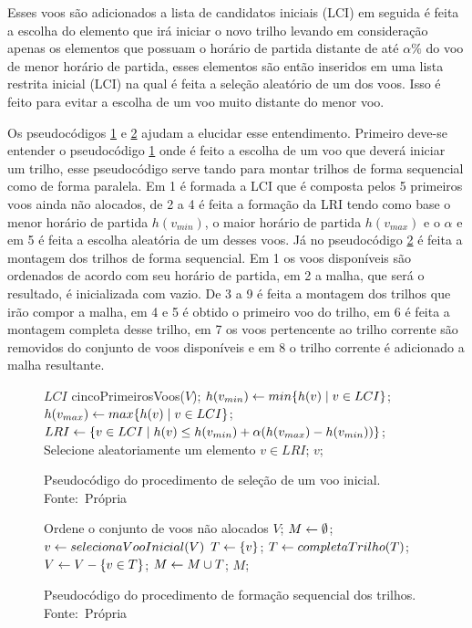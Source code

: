 Esses voos são adicionados a lista de candidatos iniciais (LCI) em seguida é
feita a escolha do elemento que irá iniciar o novo trilho levando em
consideração apenas os elementos que possuam o horário de partida distante de
até $\alpha \%$ do voo de menor horário de partida, esses elementos são então
inseridos em uma lista restrita inicial (LCI) na qual é feita a seleção
aleatório de um dos voos. Isso é feito para evitar a escolha de um voo muito
distante do menor voo.

Os pseudocódigos \ref{alg:selectinit} e \ref{alg:formseq} ajudam a elucidar esse
entendimento. Primeiro deve-se entender o pseudocódigo \ref{alg:selectinit}
onde é feito a escolha de um voo que deverá iniciar um trilho, esse
pseudocódigo serve tando para montar trilhos de forma sequencial como de forma
paralela. Em 1 é formada a LCI que é composta pelos 5 primeiros voos ainda não
alocados, de 2 a 4 é feita a formação da LRI tendo como base o menor horário de
partida $h(v_{min})$, o maior horário de partida $h(v_{max})$ e o $\alpha$ e em
5 é feita a escolha aleatória de um desses voos. Já no pseudocódigo
\ref{alg:formseq} é feita a montagem dos trilhos de forma sequencial. Em 1 os
voos disponíveis são ordenados de acordo com seu horário de partida, em 2 a
malha, que será o resultado, é inicializada com vazio. De 3 a 9 é feita a
montagem dos trilhos que irão compor a malha, em 4 e 5 é obtido o primeiro voo
do trilho, em 6 é feita a montagem completa desse trilho, em 7 os voos
pertencente ao trilho corrente são removidos do conjunto de voos disponíveis e
em 8 o trilho corrente é adicionado a malha resultante.

 \begin{figure}[h]
\caption{Pseudocódigo do procedimento de seleção de um voo inicial. \newline
\mbox{Fonte: Própria}}\label{alg:selectinit}
\begin{programma}

\STATE $LCI$ \GETS cincoPrimeirosVoos($V$);
\STATE $h(v_{min}) \leftarrow min\{h(v) \mid v \in LCI\}$;
\STATE $h(v_{max}) \leftarrow max\{h(v) \mid v \in LCI\}$;
\STATE $LRI \leftarrow \{v \in LCI \mid h(v) \leq h(v_{min}) + \alpha(h(v_{max}) -
h(v_{min}))\}$;
\STATE Selecione aleatoriamente um elemento $v \in LRI$;
\STATE\RETURN $v$;
\ENDALGORITHM
\end{programma}
\end{figure}

\begin{figure}[h]
\caption{Pseudocódigo do procedimento de formação sequencial dos trilhos.
\newline
\mbox{Fonte: Própria}}\label{alg:formseq}
\begin{programma}

\STATE Ordene o conjunto de voos não alocados $V$;
\STATE $M \leftarrow \emptyset$;
\STATE $v \leftarrow selecionaVooInicial(V)$
\STATE $T \leftarrow \{v\}$;
\STATE $T \leftarrow completaTrilho(T)$;
\STATE $V \leftarrow V - \{v \in T\}$;
\STATE $M \leftarrow M \cup T$;
\ENDWHILE
\STATE\RETURN $M$;

\ENDALGORITHM
\end{programma}
\end{figure}


